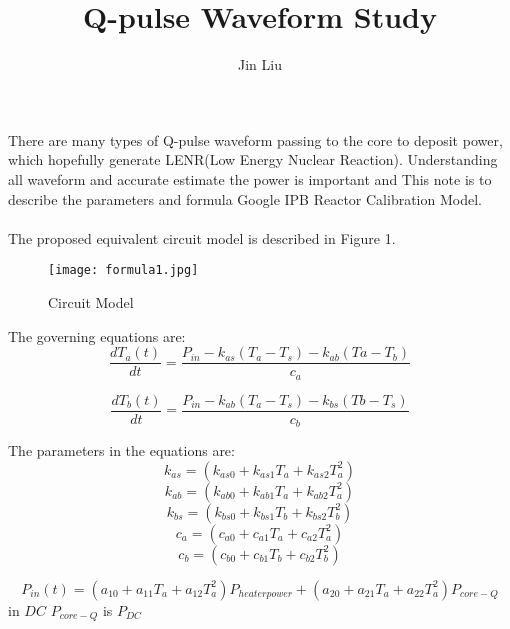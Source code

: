 \documentclass{article}
\title{Q-pulse Waveform Study}
\author{Jin Liu}
\begin{document}
\maketitle

There are many types of Q-pulse waveform passing to the core to deposit power, which hopefully generate LENR(Low Energy Nuclear Reaction). Understanding all waveform and accurate estimate the power is important   and This note is to describe the parameters and formula Google IPB Reactor Calibration Model.\\
\\

The proposed equivalent circuit model is described in Figure 1.\\

\begin{figure}
[h]
\begin{center}
\texttt{[image: formula1.jpg]} 
\caption{Circuit Model}%
\end{center}
\end{figure} 
The governing equations are:
\begin{equation}
\frac{dT_{a}(t)}{dt}=\frac{P_{in}-k_{as}(T_{a}-T_{s})-k_{ab}(T{a}-T_{b})}{c_{a}}\label{1}%
\end{equation} 

\begin{equation}
\frac{dT_{b}(t)}{dt}=\frac{P_{in}-k_{ab}(T_{a}-T_{s})-k_{bs}(T{b}-T_{s})}{c_{b}}\label{1}%
\end{equation} 

The parameters in the equations are:
\begin{equation}
k_{as}=(k_{as0}+k_{as1}T_{a}+k_{as2}T_{a}^{2})\label{1}%
\end{equation}  
\begin{equation}
k_{ab}=(k_{ab0}+k_{ab1}T_{a}+k_{ab2}T_{a}^{2})
\end{equation}  
\begin{equation}
k_{bs}=(k_{bs0}+k_{bs1}T_{b}+k_{bs2}T_{b}^{2})
\end{equation}  
\begin{equation}
c_{a}=(c_{a0}+c_{a1}T_{a}+c_{a2}T_{a}^{2})
\end{equation}  
\begin{equation}
c_{b}=(c_{b0}+c_{b1}T_{b}+c_{b2}T_{b}^{2})
\end{equation} 

\begin{equation}
P_{in}(t)=(a_{10}+a_{11}T_{a}+a_{12}T_{a}^{2})P_{heaterpower} + (a_{20}+a_{21}T_{a}+a_{22}T_{a}^{2})P_{core-Q}\label{1}%
\end{equation}
in $DC$ $P_{core-Q}$ is $P_{DC}$\\
\end{document}
